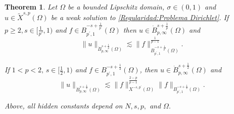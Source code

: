 \documentclass[]{amsart}
\newtheorem{theorem}{Theorem}[section]
\theoremstyle{definition}
\theoremstyle{definition}
\theoremstyle{remark}
\numberwithin{equation}{section}
\begin{document}
	\begin{theorem}
		\label{teo-reg-caso-opt}
		Let \(\Omega\) be a bounded Lipschitz domain, \( \sigma \in (0,1)\)  and \(u \in \widetilde{X}^{s,p}(\Omega)\) be a weak solution to \eqref{Regularidad:Problema Dirichlet}. If \(p \geq 2, s \in [\frac{1}{p'},1) \) and \(f \in B_{p^{\prime},1}^{-s+\frac{1}{p^{\prime}}}(\Omega)\) then \(u \in \dot{B}_{p, \infty}^{s+\frac{1}{p}}(\Omega)\) and
			\begin{equation}
				\|u\|_{\dot{B}_{p, \infty}^{s+\frac{1}{p}}(\Omega)} \lesssim\|f\|_{B_{p^{\prime}, 1}^{-s+\frac{1}{p^{\prime}}}(\Omega)}^{\frac1{p-1}}.
			\end{equation}
			


		
		If \(  1 < p <2, \,  s \in[\frac{1}{2},1)  \) and \(f \in B_{p^{\prime},1}^{-s+\frac{1}{2}}(\Omega)\), then  \(u \in \dot{B}_{p, \infty}^{s+\frac{1}{2}}(\Omega)\) and
			\begin{equation}
				\|u\|_{\dot{B}_{p, \infty}^{s+\frac12}(\Omega)} \lesssim \|f\|_{X^{-s,p^{\prime}}(\Omega)}^{\frac{2-p}{p-1}}\|f\|_{B_{p^{\prime}, 1}^{-s+\frac{1}{2}}(\Omega)}.
			\end{equation}
		
Above, all hidden constants depend on \( N,s,p, \) and \( \Omega. \)
	\end{theorem}
\end{document}

